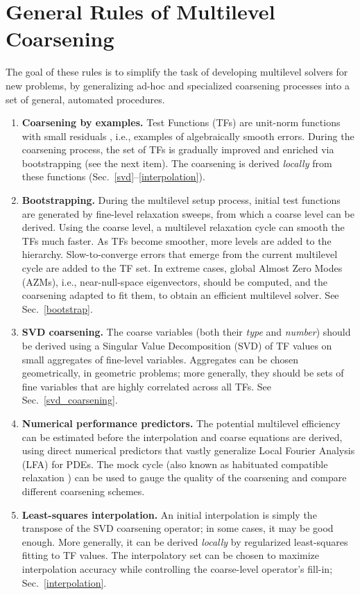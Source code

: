 \documentclass{article}
\begin{document}
\section{General Rules of Multilevel Coarsening}
\label{rules}
The goal of these rules is to simplify the task of developing multilevel solvers for new problems, by generalizing ad-hoc and specialized coarsening processes into a set of general, automated procedures.
\begin{enumerate}
    \item {\bf Coarsening by examples.} Test Functions (TFs) are unit-norm functions with small residuals \cite{lamg, bamg}, i.e., examples of algebraically smooth errors. During the coarsening process, the set of TFs is gradually improved and enriched via bootstrapping (see the next item). The coarsening is derived {\it locally} from these functions (Sec.~\ref{svd}--\ref{interpolation}).
    \item {\bf Bootstrapping.} During the multilevel setup process, initial test functions are generated by fine-level relaxation sweeps, from which a coarse level can be derived. Using the coarse level, a multilevel relaxation cycle can smooth the TFs much faster. As TFs become smoother, more levels are added to the hierarchy. Slow-to-converge errors that emerge from the current multilevel cycle are added to the TF set. In extreme cases, global Almost Zero Modes (AZMs), i.e., near-null-space eigenvectors, should be computed, and the coarsening adapted to fit them, to obtain an efficient multilevel solver. See Sec.~\ref{bootstrap}.
    \item {\bf SVD coarsening.} The coarse variables (both their {\it type} and {\it number}) should be derived using a Singular Value Decomposition (SVD) of TF values on small aggregates of fine-level variables. Aggregates can be chosen geometrically, in geometric problems; more generally, they should be sets of fine variables that are highly correlated across all TFs. See Sec.~\ref{svd_coarsening}.
    \item {\bf Numerical performance predictors.} The potential multilevel efficiency can be estimated before the interpolation and coarse equations are derived, using direct numerical predictors that vastly generalize Local Fourier Analysis (LFA) for PDEs. The mock cycle (also known as habituated compatible relaxation \cite{mg_guide, cr_oren}) can be used to gauge the quality of the coarsening and compare different coarsening schemes.
    \item {\bf Least-squares interpolation.} An initial interpolation is simply the transpose of the SVD coarsening operator; in some cases, it may be good enough. More generally, it can be derived {\it locally} by regularized least-squares fitting to TF values. The interpolatory set can be chosen to maximize interpolation accuracy while controlling the coarse-level operator's fill-in; Sec.~\ref{interpolation}.

\end{enumerate}
\end{document}
